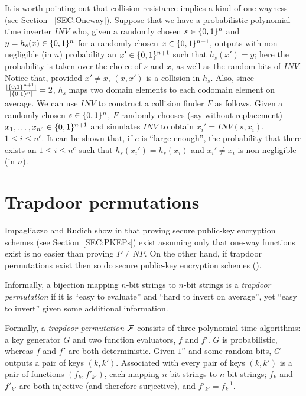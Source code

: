 It is worth pointing out that collision-resistance implies a kind of
one-wayness (see Section ~\ref{SEC:Oneway}). Suppose that we have a
probabilistic polynomial-time inverter $INV$ who, given a randomly chosen $s
\in \{0,1\}^{n}$ and $y = h_s(x) \in \{0,1\}^{n}$ for a randomly chosen $x \in
\{0,1\}^{n+1}$, outputs with non-negligible (in $n$) probability an $x' \in
\{0,1\}^{n+1}$ such that $h_s(x') = y$; here the probability is taken over the
choice of $s$ and $x$, as well as the random bits of $INV$. Notice that,
provided $x' \neq x$, $(x,x')$ is a collision in $h_s$. Also, since
$\frac{|\{0,1\}^{n+1}|}{|\{0,1\}^{n}|} = 2$, $h_s$ maps two domain elements to each
codomain element on average. We can use $INV$ to
construct a collision finder $F$ as follows. Given a randomly chosen $s \in
\{0,1\}^{n}$, $F$ randomly chooses (say without replacement) $x_1,\ldots,x_{n^c}
\in \{0,1\}^{n+1}$ and simulates $INV$ to obtain $x_i' = INV(s,x_i)$, $1 \leq i
\leq n^c$. It can be shown that, if $c$ is ``large enough'', the probability
that there exists an $1 \leq i \leq n^c$ such that $h_s(x_i') = h_s(x_i)$ and
$x_i' \neq x_i$ is non-negligible (in $n$).

\section{Trapdoor permutations}
\label{SEC:Trapdoor}
Impagliazzo and Rudich show in \cite{impagliazzo:nooneway} that proving secure
public-key encryption schemes (see Section~\ref{SEC:PKEPs}) exist assuming
only that one-way functions exist is no easier than proving $P \neq NP$. On
the other hand, if trapdoor permutations exist then so do secure public-key
encryption schemes (\cite{rackoff:cca2}). 

Informally, a bijection mapping $n$-bit strings to $n$-bit strings is a {\it
trapdoor permutation} if it is ``easy to evaluate'' and ``hard to invert on
average'', yet ``easy to invert'' given some additional information.

Formally, a {\it trapdoor permutation} $\mathcal{F}$ consists of three polynomial-time
algorithms: a key generator $G$ and two function evaluators, $f$ and $f'$. $G$
is probabilistic, whereas $f$ and $f'$ are both deterministic. Given $1^n$ and
some random bits, $G$ outputs a pair of keys $(k,k')$. Associated with every
pair of keys $(k,k')$ is a pair of functions $(f_k,f'_{k'})$, each mapping
$n$-bit strings to $n$-bit strings; $f_k$ and $f'_{k'}$ are both injective (and
therefore surjective), and $f'_{k'} = f_k^{-1}$. 

